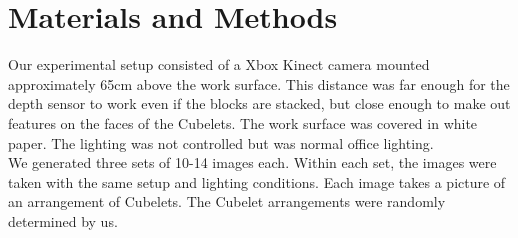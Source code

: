 \documentclass[conference]{IEEEtran}
\begin{document}
%


%



\section{Materials and Methods}
Our experimental setup consisted of a Xbox Kinect camera \cite{Kinect} mounted approximately 65cm above the work surface. This distance was far enough for the depth sensor to work even if the blocks are stacked, but close enough to make out features on the faces of the Cubelets. The work surface was covered in white paper. The lighting was not controlled but was normal office lighting.\\

We generated three sets of 10-14 images each. Within each set, the images were taken with the same setup and lighting conditions. Each image takes a picture of an arrangement of Cubelets. The Cubelet arrangements were randomly determined by us.\\
\end{document}
